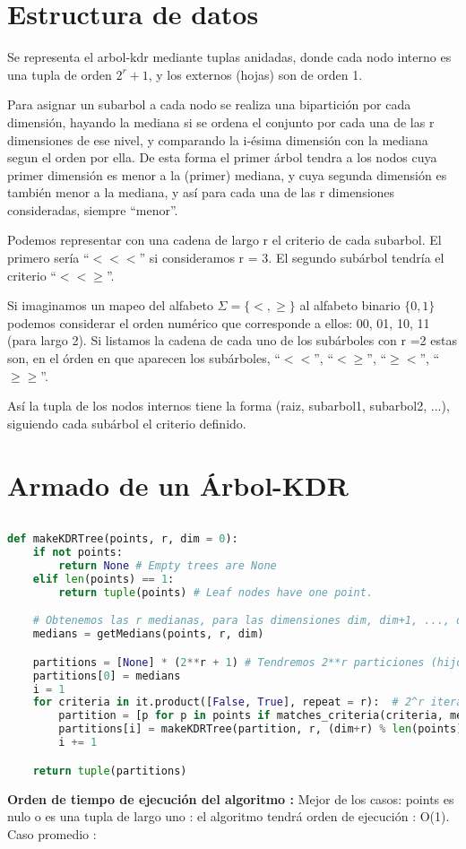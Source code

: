 \section{Estructura de datos}
  Se representa el arbol-kdr mediante tuplas anidadas, donde cada
  nodo interno es una tupla de orden $2^r + 1$, y los externos (hojas)
  son de orden 1.

  Para asignar un subarbol a cada nodo se realiza una bipartición por
  cada dimensión, hayando la mediana si se ordena el conjunto por cada
  una de las r dimensiones de ese nivel, y comparando la i-ésima
  dimensión con la mediana segun el orden por ella.
  De esta forma el primer árbol tendra a los nodos cuya primer
  dimensión es menor a la (primer) mediana, y cuya segunda dimensión
  es también menor a la mediana, y así para cada una de las r
  dimensiones consideradas, siempre ``menor''.

  Podemos representar con una cadena de largo r el
  criterio de cada subarbol. El primero sería ``$<<<$'' si consideramos
  r = 3. El segundo subárbol tendría el criterio ``$<<\geq$''.

  Si imaginamos un mapeo del alfabeto $\Sigma = \{ <, \geq \}$ al
  alfabeto binario $\{ 0, 1 \}$ podemos considerar el orden numérico
  que corresponde a ellos: 00, 01, 10, 11 (para largo 2).
  Si
  listamos la cadena de cada uno de los subárboles con r =2 estas son,
  en el órden en que aparecen los subárboles, ``$<<$'', ``$<\geq$'',
  ``$\geq<$'', ``$\geq\geq$''.
  
  Así la tupla de los nodos internos tiene la forma (raiz, subarbol1,
  subarbol2, ...), siguiendo cada subárbol el criterio definido.



\section{Armado de un Árbol-KDR}
\begin{lstlisting}[language=Python]
	
def makeKDRTree(points, r, dim = 0):
	if not points:
		return None # Empty trees are None
	elif len(points) == 1:
		return tuple(points) # Leaf nodes have one point.

	# Obtenemos las r medianas, para las dimensiones dim, dim+1, ..., dim+(r-1)
	medians = getMedians(points, r, dim)

	partitions = [None] * (2**r + 1) # Tendremos 2**r particiones (hijos)
	partitions[0] = medians
	i = 1
	for criteria in it.product([False, True], repeat = r):  # 2^r iteraciones
		partition = [p for p in points if matches_criteria(criteria, medians, p, dim)] # n iteraciones
		partitions[i] = makeKDRTree(partition, r, (dim+r) % len(points))
		i += 1

	return tuple(partitions)
	\end{lstlisting}
\textbf{ Orden de tiempo de ejecución del algoritmo : }
{Mejor de los casos: points es nulo o es una tupla de largo uno : 
el algoritmo tendrá orden de ejecución : O(1).
Caso promedio : 
}

